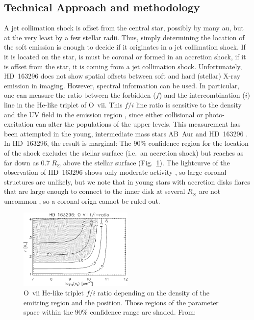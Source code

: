 \documentclass[fleqn,12pt,onecolumn]{SelfArx} %
\begin{document}
\subsection{Technical Approach and methodology}
A jet collimation shock is offset from the central star, possibly by many au, but at the very least by a few stellar radii. Thus, simply determining the location of the soft emission is enough to decide if it originates in a jet collimation shock. If it is located on the star, is must be coronal or formed in an accretion shock, if it is offset from the star, it is coming from a jet collimation shock. Unfortunately, HD~163296 does not show spatial offsets between soft and hard (stellar) X-ray emission in imaging. However, spectral information can be used. In particular, one can measure the ratio between the forbidden ($f$) and the intercombination ($i$) line in the He-like triplet of O~{\sc vii}. This $f/i$ line ratio is sensitive to the density and the UV field in the emission region \cite{2001A&A...376.1113P}, since either collisional or photo-excitation can alter the populations of the upper levels.
This measurement has been attempted in the young, intermediate mass stars AB~Aur \cite{2007A&A...468..541T} and HD~163296 \cite{2009A&A...494.1041G}. In HD~163296, the result is marginal: The 90\% confidence region for the location of the shock excludes the stellar surface (i.e.\ an accretion shock) but reaches as far down as $0.7\;R_\odot$ above the stellar surface (Fig.~\ref{fig:HDf2i}). The lightcurve of the observation of HD~163296 shows only moderate activity \cite{2009A&A...494.1041G}, so large coronal structures are unlikely, but we note that in young stars with accretion disks flares that are large enough to connect to the inner disk at several $R_\odot$ are not uncommon \cite{2005ApJS..160..469F}, so a coronal orign cannot be ruled out.


\begin{figure}
    \centering
    \includegraphics[width=0.5\textwidth]{HD163296_fi}
    \caption{O~{\sc vii} He-like triplet $f/i$ ratio depending on the density of the emitting region and the position. Those regions of the parameter space within the 90\% confidence range are shaded. From: \cite{2009A&A...494.1041G}\label{fig:HDf2i}}
\end{figure}
\end{document}
